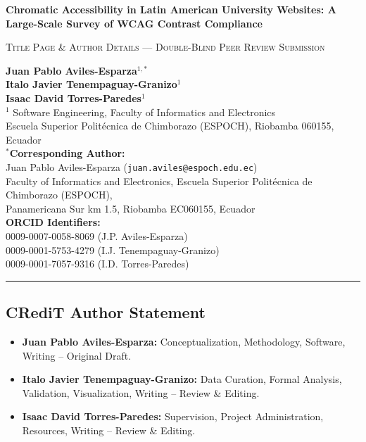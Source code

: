 \documentclass[11pt]{article}
\begin{document}
\pagestyle{empty}

\begin{center}
{\LARGE\textbf{Chromatic Accessibility in Latin American University Websites: A Large-Scale Survey of WCAG Contrast Compliance}\par}
\vspace{1.5em}
{\small\textsc{Title Page \& Author Details --- Double-Blind Peer Review Submission}\par}
\vspace{2.5em}

{\large\textbf{Juan Pablo Aviles-Esparza}}$^{1,*}$\\[0.6ex]
{\large\textbf{Italo Javier Tenempaguay-Granizo}}$^{1}$\\[0.6ex]
{\large\textbf{Isaac David Torres-Paredes}}$^{1}$\\[2em]

$^{1}$ Software Engineering, Faculty of Informatics and Electronics\\
Escuela Superior Polit\'ecnica de Chimborazo (ESPOCH), Riobamba 060155, Ecuador\\[1.5em]

\textbf{$^{*}$Corresponding Author:}\\
Juan Pablo Aviles-Esparza (\texttt{juan.aviles@espoch.edu.ec})\\
Faculty of Informatics and Electronics, Escuela Superior Polit\'ecnica de Chimborazo (ESPOCH),\\
Panamericana Sur km 1.5, Riobamba EC060155, Ecuador\\[1.5em]

\textbf{ORCID Identifiers:}\\
0009-0007-0058-8069 (J.P. Aviles-Esparza)\\
0009-0001-5753-4279 (I.J. Tenempaguay-Granizo)\\
0009-0001-7057-9316 (I.D. Torres-Paredes)
\end{center}

\vspace{2em}
\hrule
\vspace{1.5em}

\subsection*{CRediT Author Statement}
\begin{itemize}\setlength{\itemsep}{0.3em}
\item \textbf{Juan Pablo Aviles-Esparza:} Conceptualization, Methodology, Software, Writing -- Original Draft.
\item \textbf{Italo Javier Tenempaguay-Granizo:} Data Curation, Formal Analysis, Validation, Visualization, Writing -- Review \& Editing.
\item \textbf{Isaac David Torres-Paredes:} Supervision, Project Administration, Resources, Writing -- Review \& Editing.
\end{itemize}
\end{document}

